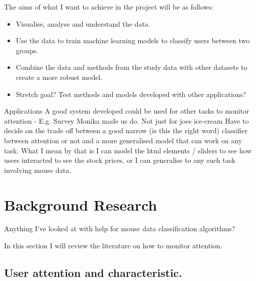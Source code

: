 \documentclass{article}
\begin{document}
The aims of what I want to achieve in the project will be as follows:
\begin{itemize}
    \item Visualise, analyse and understand the data.
    \item Use the data to train machine learning models to classify users between two groups.
    \item Combine the data and methods from the study data with other datasets to create a more robust model.
    \item Stretch goal? Test methods and models developed with other applications?
\end{itemize}






Applications
A good system developed could be used for other tasks to monitor attention - E.g. Survey Monika made us do. Not just for joes ice-cream
Have to decide on the trade off between a good narrow (is this the right word) classifier between attention or not and a more generalised model that can work on any task.
What I mean by that is I can model the html elements / sliders to see how users interacted to see the stock prices, or I can generalise to any such task involving mouse data.


\section{Background Research}
Anything I've looked at with help for mouse data classification algorithms? 

In this section I will review the literature on how to monitor attention.

\subsection{User attention and characteristic.}
\end{document}
